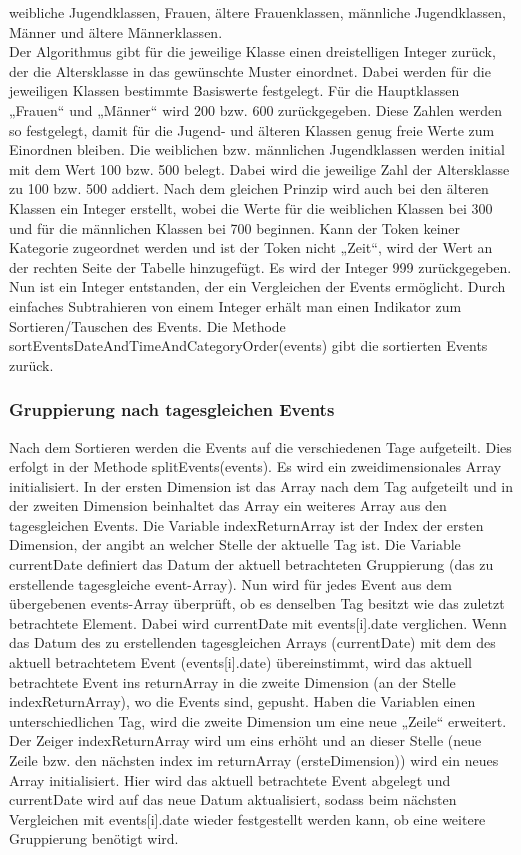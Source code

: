 weibliche Jugendklassen, Frauen, ältere Frauenklassen, männliche Jugendklassen, Männer und ältere Männerklassen. \\
Der Algorithmus gibt für die jeweilige Klasse einen dreistelligen Integer zurück, der die Altersklasse in das gewünschte Muster einordnet. Dabei werden für die jeweiligen Klassen bestimmte Basiswerte festgelegt. Für die Hauptklassen „Frauen“ und „Männer“ wird 200 bzw. 600 zurückgegeben. Diese Zahlen werden so festgelegt, damit für die Jugend- und älteren Klassen genug freie Werte zum Einordnen bleiben. Die weiblichen bzw. männlichen Jugendklassen werden initial mit dem Wert 100 bzw. 500 belegt. Dabei wird die jeweilige Zahl der Altersklasse zu 100 bzw. 500 addiert. Nach dem gleichen Prinzip wird auch bei den älteren Klassen ein Integer erstellt, wobei die Werte für die weiblichen Klassen bei 300 und für die männlichen Klassen bei 700 beginnen. Kann der Token keiner Kategorie zugeordnet werden und ist der Token nicht „Zeit“, wird der Wert an der rechten Seite der Tabelle hinzugefügt. Es wird der Integer 999 zurückgegeben.
Nun ist ein Integer entstanden, der ein Vergleichen der Events ermöglicht. Durch einfaches Subtrahieren von einem Integer erhält man einen Indikator zum Sortieren/Tauschen des Events. Die Methode sortEventsDateAndTimeAndCategoryOrder(events) gibt die sortierten Events zurück.

\subsubsection{Gruppierung nach tagesgleichen Events}
Nach dem Sortieren werden die Events auf die verschiedenen Tage aufgeteilt. Dies erfolgt in der Methode splitEvents(events). Es wird ein zweidimensionales Array initialisiert. In der ersten Dimension ist das Array nach dem Tag aufgeteilt und in der zweiten Dimension beinhaltet das Array ein weiteres Array aus den tagesgleichen Events. Die Variable indexReturnArray ist der Index der ersten Dimension, der angibt an welcher Stelle der aktuelle Tag ist. Die Variable currentDate definiert das Datum der aktuell betrachteten Gruppierung (das zu erstellende tagesgleiche event-Array). 
Nun wird für jedes Event aus dem übergebenen events-Array überprüft, ob es denselben Tag besitzt wie das zuletzt betrachtete Element. Dabei wird currentDate mit events[i].date verglichen. 
Wenn das Datum des zu erstellenden tagesgleichen Arrays (currentDate) mit dem des aktuell betrachtetem Event (events[i].date) übereinstimmt, wird das aktuell betrachtete Event ins returnArray in die zweite Dimension (an der Stelle indexReturnArray), wo die Events sind, gepusht.
Haben die Variablen einen unterschiedlichen Tag, wird die zweite Dimension um eine neue „Zeile“ erweitert. Der Zeiger indexReturnArray wird um eins erhöht und an dieser Stelle (neue Zeile bzw. den nächsten index im returnArray (ersteDimension)) wird ein neues Array initialisiert. Hier wird das aktuell betrachtete Event abgelegt und currentDate wird auf das neue Datum aktualisiert, sodass beim nächsten Vergleichen mit events[i].date wieder festgestellt werden kann, ob eine weitere Gruppierung benötigt wird.

